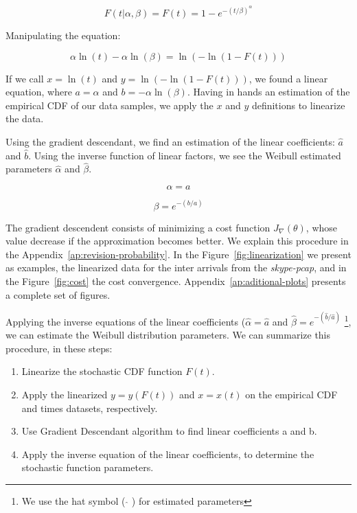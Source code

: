 \begin{equation}
F(t|\alpha, \beta) = F(t) = 1 - e^{-(t/\beta)^{\alpha}}
\end{equation}

Manipulating the equation:

\begin{equation}
\alpha\ln{(t)} - \alpha\ln{(\beta)} = \ln{(-\ln{(1 - F(t))})}
\end{equation}

If we call $x = \ln{(t)}$ and $y = \ln{(-\ln{(1 - F(t))})}$, we found a linear equation, where  $a = \alpha$ and $b = -\alpha\ln{(\beta)}$. Having in hands an estimation of the empirical CDF of our data samples, we apply the $x$ and $y$ definitions to linearize the data.

Using the gradient descendant, we find an estimation of the linear coefficients: $\hat{a}$ and  $\hat{b}$.  Using the inverse function of linear factors, we see the Weibull estimated parameters  $\hat{\alpha}$ and $\hat{\beta}$.

\begin{equation}
\alpha = a
\end{equation}

\begin{equation}
\beta = e^{-(b/a)}
\end{equation}


The gradient descendent consists of minimizing a cost function $J_\nabla(\theta)$, whose value decrease if the approximation becomes better. We explain this procedure in the Appendix~\ref{ap:revision-probability}. In the Figure~\ref{fig:linearization} we present as examples, the linearized data for the inter arrivals from the \textit{skype-pcap}, and in the Figure~\ref{fig:cost} the cost convergence. Appendix~\ref{ap:aditional-plots} presents a complete set of figures.

Applying the inverse equations of the linear coefficients ($\hat{\alpha} = \hat{a}$ and $\hat{\beta} = e^{-(\hat{b}/\hat{a})}$  \footnote{We use the hat symbol ( $ \widehat{} $ ) for estimated parameters}, we can estimate the Weibull distribution parameters. We can summarize this procedure, in these steps:

\begin{enumerate}
\item Linearize the stochastic CDF function $F(t)$.
\item Apply the linearized  $y = y(F(t))$ and $x = x(t)$ on the empirical CDF and times datasets, respectively.
\item Use Gradient Descendant algorithm to find linear coefficients a and b.
\item Apply the inverse equation of the linear coefficients, to determine the stochastic function parameters.
\end{enumerate}



